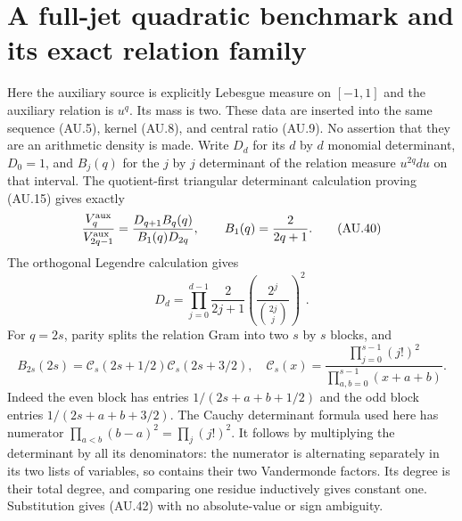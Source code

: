 \documentclass[11pt]{article}
\begin{document}
\section{A full-jet quadratic benchmark and its exact relation family}

Here the auxiliary source is explicitly Lebesgue measure on $[-1,1]$
and the auxiliary relation is $u^q$. Its mass is two. These data are
inserted into the same sequence (AU.5), kernel (AU.8), and central
ratio (AU.9). No assertion that they are an arithmetic density is
made. Write $D_d$ for its $d$ by $d$ monomial determinant, $D_0=1$,
and $B_j(q)$ for the $j$ by $j$ determinant of the relation measure
$u^{2q}du$ on that interval. The quotient-first triangular determinant
calculation proving (AU.15) gives exactly
\[
 \frac{V_q^{\rm aux}}{V_{2q-1}^{\rm aux}}
       =\frac{D_{q+1}B_q(q)}{B_1(q)D_{2q}},\qquad
 B_1(q)=\frac2{2q+1}.                                    \tag{AU.40}
\]
The orthogonal Legendre calculation gives
\[
 D_d=\prod_{j=0}^{d-1}\frac{2}{2j+1}
         \left(\frac{2^j}{\binom{2j}{j}}\right)^2.        \tag{AU.41}
\]
For $q=2s$, parity splits the relation Gram into two $s$ by $s$
blocks, and
\[
 B_{2s}(2s)=\mathcal C_s(2s+1/2)\mathcal C_s(2s+3/2),
 \quad
 \mathcal C_s(x)=\frac{\prod_{j=0}^{s-1}(j!)^2}
                       {\prod_{a,b=0}^{s-1}(x+a+b)}.
 \tag{AU.42}
\]
Indeed the even block has entries $1/(2s+a+b+1/2)$ and the odd
block entries $1/(2s+a+b+3/2)$. The Cauchy determinant formula
used here has numerator $\prod_{a<b}(b-a)^2=\prod_j(j!)^2$.
It follows by multiplying the determinant by all its denominators:
the numerator is alternating separately in its two lists of variables,
so contains their two Vandermonde factors. Its degree is their total
degree, and comparing one residue inductively gives constant one.
Substitution gives (AU.42) with no absolute-value or sign ambiguity.
\end{document}
